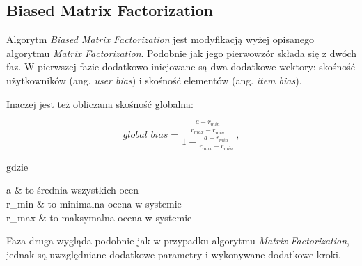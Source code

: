 \documentclass[twoside]{iisthesis}
\begin{document}
	
		 \subsection{Biased Matrix Factorization}
		 
		 Algorytm \textit{Biased Matrix Factorization} jest modyfikacją wyżej opisanego algorytmu \textit{Matrix Factorization}. Podobnie jak jego pierwowzór składa się z dwóch faz. W pierwszej fazie dodatkowo inicjowane są dwa dodatkowe wektory: skośność użytkowników (ang. \textit{user bias}) i skośność elementów (ang. \textit{item bias}). 
		 
		 Inaczej jest też obliczana skośność globalna: 
 		 
		 \begin{equation}
		 \label{eq:global_bias}
		 global\_bias = 
		 \frac
		 { 
		 	\frac{ a - r_{min} }{ r_{max} - r_{min} }
		 }
		 {
		 	1 - \frac{ a - r_{min} }{ r_{max} - r_{min} }	
		 }
		 \,,
		 \end{equation} 
		 		
		 gdzie
		 
		 \begin{conditions*}
		 	a & to średnia wszystkich ocen \\
		 	r_{min}  &  to minimalna ocena w systemie  \\
		 	r_{max}  &  to maksymalna ocena w systemie
 		 \end{conditions*} 
		 
		 Faza druga wygląda podobnie jak w przypadku algorytmu \textit{Matrix Factorization}, jednak są uwzględniane dodatkowe parametry i wykonywane dodatkowe kroki.
		 
\end{document}

